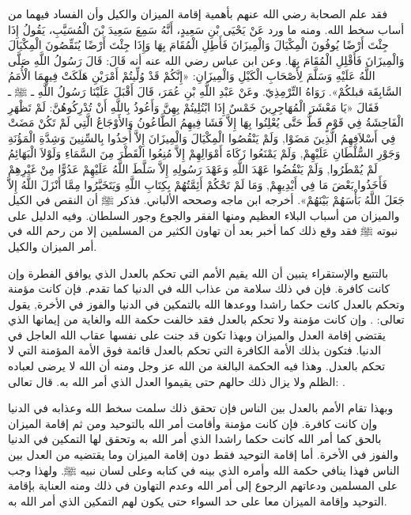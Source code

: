 فقد علم الصحابة رضي الله عنهم بأهمية إقامة الميزان والكيل وأن الفساد فيهما من أساب سخط الله. ومنه ما ورد عَنْ يَحْيَى بْنِ سَعِيدٍ، أَنَّهُ سَمِعَ سَعِيدَ بْنَ الْمُسَيَّبِ، يَقُولُ إِذَا جِئْتَ أَرْضًا يُوفُونَ الْمِكْيَالَ وَالْمِيزَانَ فَأَطِلِ الْمُقَامَ بِهَا وَإِذَا جِئْتَ أَرْضًا يُنَقِّصُونَ الْمِكْيَالَ وَالْمِيزَانَ فَأَقْلِلِ الْمُقَامَ بِهَا. وعن ابن عباس رضي الله عنه أنه قَالَ: قَالَ رَسُولُ اللَّهِ صَلَّى اللَّهُ عَلَيْهِ وَسَلَّمَ لِأَصْحَابِ الْكَيْلِ وَالْمِيزَانِ: «إِنَّكُمْ قَدْ وُلِّيتُمْ أَمْرَيْنِ هَلَكَتْ فِيهِمَا الْأُمَمُ السَّابِقَة قبلكُمْ».
{\footnotesize رَوَاهُ التِّرْمِذِيّ}.
وعَنْ عَبْدِ اللَّهِ بْنِ عُمَرَ، قَالَ أَقْبَلَ عَلَيْنَا رَسُولُ اللَّهِ ـ ﷺ ـ فَقَالَ «يَا مَعْشَرَ الْمُهَاجِرِينَ خَمْسٌ إِذَا ابْتُلِيتُمْ بِهِنَّ وَأَعُوذُ بِاللَّهِ أَنْ تُدْرِكُوهُنَّ: لَمْ تَظْهَرِ الْفَاحِشَةُ فِي قَوْمٍ قَطُّ حَتَّى يُعْلِنُوا بِهَا إِلاَّ فَشَا فِيهِمُ الطَّاعُونُ وَالأَوْجَاعُ الَّتِي لَمْ تَكُنْ مَضَتْ فِي أَسْلاَفِهِمُ الَّذِينَ مَضَوْا, وَلَمْ يَنْقُصُوا الْمِكْيَالَ وَالْمِيزَانَ إِلاَّ أُخِذُوا بِالسِّنِينَ وَشِدَّةِ الْمَؤُنَةِ وَجَوْرِ السُّلْطَانِ عَلَيْهِمْ, وَلَمْ يَمْنَعُوا زَكَاةَ أَمْوَالِهِمْ إِلاَّ مُنِعُوا الْقَطْرَ مِنَ السَّمَاءِ وَلَوْلاَ الْبَهَائِمُ لَمْ يُمْطَرُوا, وَلَمْ يَنْقُضُوا عَهْدَ اللَّهِ وَعَهْدَ رَسُولِهِ إِلاَّ سَلَّطَ اللَّهُ عَلَيْهِمْ عَدُوًّا مِنْ غَيْرِهِمْ فَأَخَذُوا بَعْضَ مَا فِي أَيْدِيهِمْ, وَمَا لَمْ تَحْكُمْ أَئِمَّتُهُمْ بِكِتَابِ اللَّهِ وَيَتَخَيَّرُوا مِمَّا أَنْزَلَ اللَّهُ إِلاَّ جَعَلَ اللَّهُ بَأْسَهُمْ بَيْنَهُمْ».
{\footnotesize أخرجه ابن ماجه وصححه الألباني}.
فذكر ﷺ أن النقص في الكيل والميزان من أسباب البلاء العظيم ومنها الفقر والجوع وجور السلطان. وفيه الدليل على نبوته ﷺ فقد وقع ذلك كما أخبر بعد أن تهاون الكثير من المسلمين إلا من رحم الله في أمر الميزان والكيل.

بالتتبع والإستقراء يتبين أن الله يقيم الأمم التي تحكم بالعدل الذي يوافق الفطرة وإن كانت كافرة. فإن في ذلك سلامة من عذاب الله في الدنيا كما تقدم. فإن كانت مؤمنة وتحكم بالعدل كانت حكما راشدا ووعدها الله بالتمكين في الدنيا والفوز في الأخرة, يقول تعالى:
\quranayah*[24][55]{\footnotesize \surahname*[24]}.
وإن كانت مؤمنة ولا تحكم بالعدل فقد خالفت حكمة الله والغاية من إيمانها الذي يقتضي إقامة العدل والميزان وبهذا تكون قد جنت على نفسها عقاب الله العاجل في الدنيا. فتكون بذلك الأمة الكافرة التي تحكم بالعدل قائمة فوق الأمة المؤمنة التي لا تحكم بالعدل. وهذا فيه الحكمة البالغة من الله عز وجل ومنه أن الله لا يرضى لعباده الظلم ولا يزال ذلك حالهم حتى يقيموا العدل الذي أمر الله به. قال تعالى:
\quranayah*[13][11][12]{\footnotesize \surahname*[13]}.

وبهذا تقام الأمم بالعدل بين الناس فإن تحقق ذلك سلمت سخط الله وعذابه في الدنيا وإن كانت كافرة. فإن كانت مؤمنة وأقامت أمر الله بالتوحيد ومن ثم إقامة الميزان بالحق كما أمر الله كانت حكما راشدا الذي أمر الله به وتحقق لها التمكين في الدنيا والفوز في الأخرة. أما إقامة التوحيد فقط دون إقامة الميزان وما يقتضيه من العدل بين الناس فهذا ينافي حكمة الله وأمره الذي بينه في كتابه وعلى لسان نبيه ﷺ. ولهذا وجب على المسلمين ودعاتهم الرجوع إلى أمر الله وعدم التهاون في ذلك ومنه العناية بإقامة التوحيد وإقامة الميزان معا على حد السواء حتى يكون لهم التمكين الذي أمر الله به.


